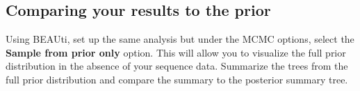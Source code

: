 \documentclass[12pt]{article}
\begin{document}
\medskip{}

\subsection*{Comparing your results to the prior}

Using BEAUti, set up the same analysis but under the MCMC options, select the {\bf Sample from prior only} option. This will allow you to visualize the full prior distribution in the absence of your sequence data. Summarize the trees from the full prior
distribution and compare the summary to the posterior summary tree.

% 
% 
%
% 
 
%

\end{document}
